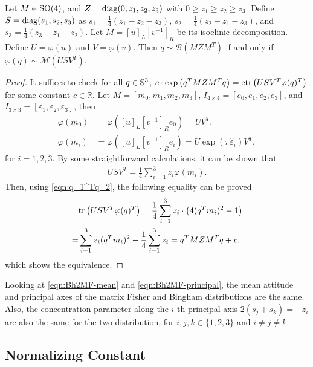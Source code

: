 \begin{theorem} \label{thm:Bh2MF}
	Let $M\in\mathrm{SO}(4)$, and $Z = \mathrm{diag}(0,z_1,z_2,z_3)$ with $0 \geq z_1 \geq z_2 \geq z_3$.
	Define $S = \mathrm{diag}(s_1,s_2,s_3)$ as $s_1 = \tfrac{1}{4}(z_1-z_2-z_3)$, $s_2 = \tfrac{1}{4}(z_2-z_1-z_3)$, and $s_3 = \tfrac{1}{4}(z_3-z_1-z_2)$.
	Let $M = [u]_L[v^{-1}]_R$ be its isoclinic decomposition.
	Define $U = \varphi(u)$ and $V = \varphi(v)$.
	Then $q\sim\mathcal{B}(MZM^T)$ if and only if $\varphi(q)\sim\mathcal{M}(USV^T)$.
\end{theorem}
\begin{proof}
	It suffices to check for all $q\in\mathbb{S}^3$, $c\cdot\exp\left(q^TMZM^Tq\right) = \mathrm{etr}\left( USV^T\varphi(q)^T \right)$ for some constant $c\in\mathbb{R}$.
	Let $M = [m_0, m_1, m_2, m_3]$, $I_{4\times 4} = [e_0, e_1, e_2, e_3]$, and $I_{3\times 3} = [\varepsilon_1, \varepsilon_2, \varepsilon_3]$, then
	\begin{align}
		\varphi(m_0) &= \varphi([u]_L[v^{-1}]_Re_0) = UV^T, \label{eqn:Bh2MF-mean} \\
		\varphi(m_i) &= \varphi([u]_L[v^{-1}]_Re_i) = U\exp(\pi\hat{\varepsilon}_i) V^T \label{eqn:Bh2MF-principal},
	\end{align}
	for $i=1,2,3$.
	By some straightforward calculations, it can be shown that
	\begin{align*}
		USV^T = \frac{1}{4}\sum_{i=1}^{3} z_i\varphi(m_i).
	\end{align*}
	Then, using \eqref{eqn:q_1^Tq_2}, the following equality can be proved
	\begin{align*}
		&\mathrm{tr}\left( USV^T\varphi(q)^T \right) = \frac{1}{4} \sum_{i=1}^3 z_i\cdot\left( 4(q^Tm_i)^2-1 \right) \\
		= &\sum_{i=1}^3 z_i(q^Tm_i)^2 - \frac{1}{4}\sum_{i=1}^3 z_i = q^TMZM^Tq + c,
	\end{align*}
	which shows the equivalence.
\end{proof}

Looking at \eqref{eqn:Bh2MF-mean} and \eqref{eqn:Bh2MF-principal}, the mean attitude and principal axes of the matrix Fisher and Bingham distributions are the same.
Also, the concentration parameter along the $i$-th principal axis $2(s_j+s_k) = -z_i$ are also the same for the two distribution, for $i,j,k\in\{1,2,3\}$ and $i\neq j\neq k$.

\subsection{Normalizing Constant}

